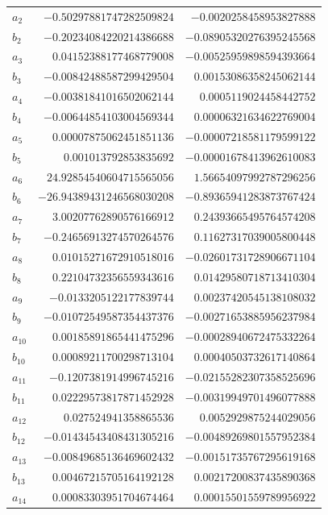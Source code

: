 \documentclass[11pt]{article}
\theoremstyle{definition}
\begin{document}
{\begin{longtable}{lrr}
$a_{2}$ & $-0.50297881747282509824$ & $-0.0020258458953827888$\\
$b_{2}$ & $-0.20234084220214386688$ & $-0.08905320276395245568$\\
$a_{3}$ & $0.04152388177468779008$ & $-0.00525959898594393664$\\
$b_{3}$ & $-0.00842488587299429504$ & $0.00153086358245062144$\\
$a_{4}$ & $-0.00381841016502062144$ & $0.0005119024458442752$\\
$b_{4}$ & $-0.00644854103004569344$ & $0.00006321634622769004$\\
$a_{5}$ & $0.00007875062451851136$ & $-0.00007218581179599122$\\
$b_{5}$ & $0.001013792853835692$ & $-0.00001678413962610083$\\
$a_{6}$ & $24.92854540604715565056$ & $1.56654097992787296256$\\
$b_{6}$ & $-26.94389431246568030208$ & $-0.89365941283873767424$\\
$a_{7}$ & $3.00207762890576166912$ & $0.24393665495764574208$\\
$b_{7}$ & $-0.24656913274570264576$ & $0.11627317039005800448$\\
$a_{8}$ & $0.01015271672910518016$ & $-0.02601731728906671104$\\
$b_{8}$ & $0.22104732356559343616$ & $0.01429580718713410304$\\
$a_{9}$ & $-0.0133205122177839744$ & $0.00237420545138108032$\\
$b_{9}$ & $-0.01072549587354437376$ & $-0.00271653885956237984$\\
$a_{10}$ & $0.00185891865441475296$ & $-0.00028940672475332264$\\
$b_{10}$ & $0.00089211700298713104$ & $0.00040503732617140864$\\
$a_{11}$ & $-0.1207381914996745216$ & $-0.02155282307358525696$\\
$b_{11}$ & $0.02229573817871452928$ & $-0.00319949701496077888$\\
$a_{12}$ & $0.027524941358865536$ & $0.0052929875244029056$\\
$b_{12}$ & $-0.01434543408431305216$ & $-0.00489269801557952384$\\
$a_{13}$ & $-0.00849685136469602432$ & $-0.00151735767295619168$\\
$b_{13}$ & $0.00467215705164192128$ & $0.00217200837435890368$\\
$a_{14}$ & $0.00083303951704674464$ & $0.00015501559789956922$\\

\end{longtable}}
\end{document}
